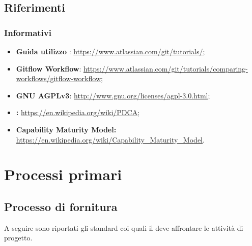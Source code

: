 \documentclass[a4paper, titlepage]{article}
\begin{document}
\subsection{Riferimenti}


\subsubsection{Informativi}
\label{rifinfo}
\begin{itemize}
	\item \textbf{Guida utilizzo }: 
		\newline \url{https://www.atlassian.com/git/tutorials/};
	\item \textbf{Gitflow Workflow}: 
		\newline \url{https://www.atlassian.com/git/tutorials/comparing-workflows/gitflow-workflow};
	\item \textbf{GNU AGPLv3}: 
		\newline \url{http://www.gnu.org/licenses/agpl-3.0.html};
	\item \textbf{:}
		\newline \url{https://en.wikipedia.org/wiki/PDCA};
	\item \textbf{Capability Maturity Model:}
		\newline \url{https://en.wikipedia.org/wiki/Capability_Maturity_Model}.
\end{itemize}

\newpage

\section{Processi primari}

\subsection{Processo di fornitura}
A seguire sono riportati gli standard coi quali il  deve affrontare le attività di progetto.
\end{document}
